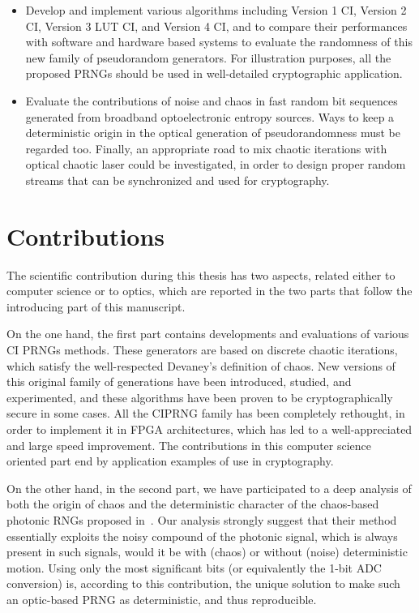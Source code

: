 \begin{itemize}
\item Develop and implement various algorithms including Version 1 CI, Version 2 CI, Version 3 LUT CI, and Version 4 CI, and to compare their performances with software and hardware based systems to evaluate the randomness of this new family of pseudorandom generators. For illustration purposes, all the proposed PRNGs should be used in well-detailed cryptographic application.

\item Evaluate the contributions of noise and chaos in fast random bit sequences generated from broadband optoelectronic entropy sources. Ways to keep a deterministic origin in the optical generation 
of pseudorandomness must be regarded too. Finally, an appropriate road to mix chaotic iterations with optical chaotic laser could be investigated, in order to design proper random streams that can be synchronized and used for cryptography. 
\end{itemize}

\section{Contributions}

The scientific contribution during this thesis has two aspects, related either
to computer science or to optics, which are reported in the two parts that follow
the introducing part of this manuscript.

On the one hand, the first part contains developments and evaluations of various CI PRNGs methods. 
These generators are based on discrete chaotic iterations, which satisfy the well-respected 
Devaney's definition of chaos. New versions of this original family of generations have been 
introduced, studied, and experimented, and these algorithms have been proven to be 
cryptographically secure in some cases. 
All the CIPRNG family has been completely rethought, in order to implement it in FPGA architectures, 
which has led to a well-appreciated and large speed improvement. The contributions in this
computer science oriented part end by application examples of use in cryptography.

On the other hand, in the second part, we have participated to a deep analysis of 
both the origin of chaos and
the deterministic character of the chaos-based photonic RNGs proposed 
in~\cite{ultrafast2009, ultrafast2010}. Our analysis strongly suggest that
their method essentially exploits the noisy compound of the photonic signal, which
is always present in such signals, would it be with (chaos) or without (noise) 
deterministic motion. Using only the most significant bits (or equivalently the 1-bit 
ADC conversion) is, according to this contribution, the unique solution to make
such an optic-based PRNG as deterministic, and thus reproducible. 


